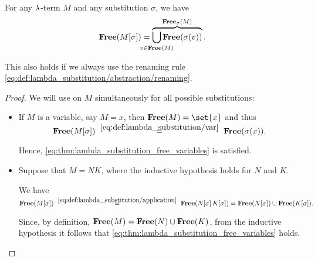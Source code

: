 \begin{proposition}\label{thm:lambda_substitution_free_variables}
  For any \( \mathrm{\lambda} \)-term \( M \) and any substitution \( \sigma \), we have
  \begin{equation}\label{eq:thm:lambda_substitution_free_variables}
    \op*{Free}( M[\sigma] ) = \overbrace{\bigcup_{\mathclap{v \in \op*{Free}(M)}} \op*{Free}(\sigma(v))}^{\op*{Free}_\sigma(M)}.
  \end{equation}

  This also holds if we always use the renaming rule \eqref{eq:def:lambda_substitution/abstraction/renaming}.
\end{proposition}
\begin{proof}
  We will use  on \( M \) simultaneously for all possible substitutions:
  \begin{itemize}
    \item If \( M \) is a variable, say \( M = x \), then \( \op*{Free}(M) = \set{ x } \) and thus
    \begin{equation*}
      \op*{Free}(M[\sigma])
      \reloset {\eqref{eq:def:lambda_substitution/var}} =
      \op*{Free}(\sigma(x)).
    \end{equation*}

    Hence, \eqref{eq:thm:lambda_substitution_free_variables} is satisfied.

    \item Suppose that \( M = NK \), where the inductive hypothesis holds for \( N \) and \( K \).

    We have
    \begin{equation*}
      \op*{Free}(M[\sigma])
      \reloset {\eqref{eq:def:lambda_substitution/application}} =
      \op*{Free}(N[\sigma] \thinspace K[\sigma])
      =
      \op*{Free}(N[\sigma]) \cup \op*{Free}(K[\sigma]).
    \end{equation*}

    Since, by definition, \( \op*{Free}(M) = \op*{Free}(N) \cup \op*{Free}(K) \), from the inductive hypothesis it follows that \eqref{eq:thm:lambda_substitution_free_variables} holds.


\end{itemize}
\end{proof}

